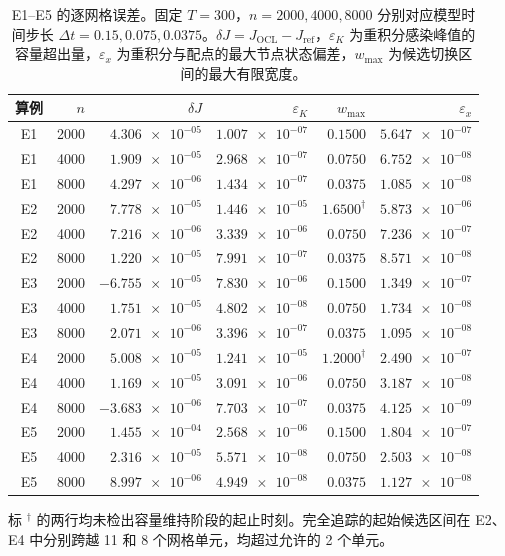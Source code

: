 \begin{table}[htbp]
\centering\small
\setlength{\tabcolsep}{5pt}
\caption{E1--E5 的逐网格误差。固定 $T=300$，$n=2000,4000,8000$ 分别对应模型时间步长 $\Delta t=0.15,0.075,0.0375$。$\delta J=J_{\mathrm{OCL}}-J_{\mathrm{ref}}$，$\varepsilon_K$ 为重积分感染峰值的容量超出量，$\varepsilon_x$ 为重积分与配点的最大节点状态偏差，$w_{\max}$ 为候选切换区间的最大有限宽度。}
\label{tab:grid-errors-all}
\begin{tabular}{@{}crrrrr@{}}
\toprule
算例 & $n$ & $\delta J$ & $\varepsilon_K$ & $w_{\max}$ & $\varepsilon_x$\\
\midrule
E1 & 2000 & $\num{+4.306e-05}$ & $\num{1.007e-07}$ & $0.1500$ & $\num{5.647e-07}$\\
E1 & 4000 & $\num{+1.909e-05}$ & $\num{2.968e-07}$ & $0.0750$ & $\num{6.752e-08}$\\
E1 & 8000 & $\num{+4.297e-06}$ & $\num{1.434e-07}$ & $0.0375$ & $\num{1.085e-08}$\\
\addlinespace[2pt]
E2 & 2000 & $\num{+7.778e-05}$ & $\num{1.446e-05}$ & $1.6500^{\dagger}$ & $\num{5.873e-06}$\\
E2 & 4000 & $\num{+7.216e-06}$ & $\num{3.339e-06}$ & $0.0750$ & $\num{7.236e-07}$\\
E2 & 8000 & $\num{+1.220e-05}$ & $\num{7.991e-07}$ & $0.0375$ & $\num{8.571e-08}$\\
\addlinespace[2pt]
E3 & 2000 & $\num{-6.755e-05}$ & $\num{7.830e-06}$ & $0.1500$ & $\num{1.349e-07}$\\
E3 & 4000 & $\num{+1.751e-05}$ & $\num{4.802e-08}$ & $0.0750$ & $\num{1.734e-08}$\\
E3 & 8000 & $\num{+2.071e-06}$ & $\num{3.396e-07}$ & $0.0375$ & $\num{1.095e-08}$\\
\addlinespace[2pt]
E4 & 2000 & $\num{+5.008e-05}$ & $\num{1.241e-05}$ & $1.2000^{\dagger}$ & $\num{2.490e-07}$\\
E4 & 4000 & $\num{+1.169e-05}$ & $\num{3.091e-06}$ & $0.0750$ & $\num{3.187e-08}$\\
E4 & 8000 & $\num{-3.683e-06}$ & $\num{7.703e-07}$ & $0.0375$ & $\num{4.125e-09}$\\
\addlinespace[2pt]
E5 & 2000 & $\num{+1.455e-04}$ & $\num{2.568e-06}$ & $0.1500$ & $\num{1.804e-07}$\\
E5 & 4000 & $\num{+2.316e-05}$ & $\num{5.571e-08}$ & $0.0750$ & $\num{2.503e-08}$\\
E5 & 8000 & $\num{+8.997e-06}$ & $\num{4.949e-08}$ & $0.0375$ & $\num{1.127e-08}$\\
\bottomrule
\end{tabular}
\par\smallskip
\begin{minipage}{0.98\linewidth}\footnotesize
标 $^{\dagger}$ 的两行均未检出容量维持阶段的起止时刻。完全追踪的起始候选区间在 E2、E4 中分别跨越 11 和 8 个网格单元，均超过允许的 2 个单元。
\end{minipage}
\end{table}
